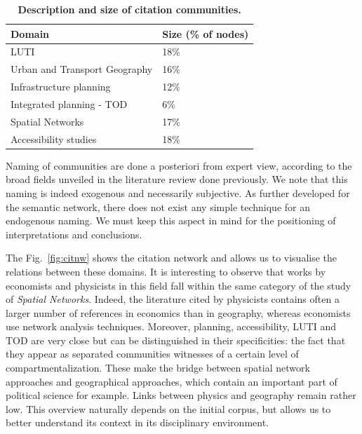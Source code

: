 \documentclass[10pt]{article}
\begin{document}
\begin{table}
\caption{\textbf{Description and size of citation communities.}\label{tab:citation}}
\begin{center}
\begin{tabular}{|l|l|}
\hline
	Domain & Size (\% of nodes)\\\hline
	LUTI & 18\% \\\hline
	Urban and Transport Geography & 16\% \\\hline
	Infrastructure planning & 12\% \\\hline
	Integrated planning - TOD & 6\% \\\hline
	Spatial Networks & 17\% \\\hline
	Accessibility studies & 18\% \\\hline
\end{tabular}
\end{center}
\end{table}


Naming of communities are done a posteriori from expert view, according to the broad fields unveiled in the literature review done previously. We note that this naming is indeed exogenous and necessarily subjective. As further developed for the semantic network, there does not exist any simple technique for an endogenous naming. We must keep this aspect in mind for the positioning of interpretations and conclusions.

The Fig.~\ref{fig:citnw} shows the citation network and allows us to visualise the relations between these domains. It is interesting to observe that works by economists and physicists in this field fall within the same category of the study of \emph{Spatial Networks}. Indeed, the literature cited by physicists contains often a larger number of references in economics than in geography, whereas economists use network analysis techniques. Moreover, planning, accessibility, LUTI and TOD are very close but can be distinguished in their specificities: the fact that they appear as separated communities witnesses of a certain level of compartmentalization. These make the bridge between spatial network approaches and geographical approaches, which contain an important part of political science for example. Links between physics and geography remain rather low. This overview naturally depends on the initial corpus, but allows us to better understand its context in its disciplinary environment.
\end{document}
